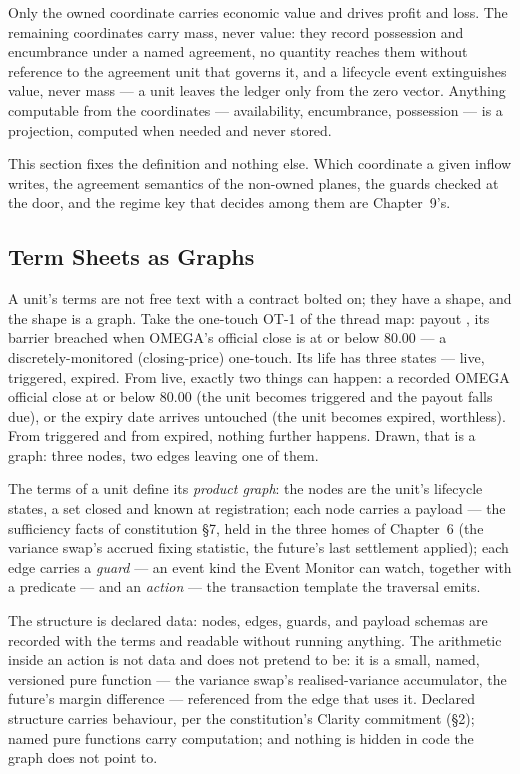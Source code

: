 Only the owned coordinate carries economic value and drives profit and loss. The
remaining coordinates carry mass, never value: they record possession and encumbrance
under a named agreement, no quantity reaches them without reference to the agreement
unit that governs it, and a lifecycle event extinguishes value, never mass --- a unit
leaves the ledger only from the zero vector. Anything computable from the coordinates
--- availability, encumbrance, possession --- is a projection, computed when needed and
never stored.

This section fixes the definition and nothing else. Which coordinate a given inflow
writes, the agreement semantics of the non-owned planes, the guards checked at the door,
and the regime key that decides among them are Chapter~9's.

\subsection{Term Sheets as Graphs}\label{sec:termsheet-graphs}

A unit's terms are not free text with a contract bolted on; they have a shape, and the
shape is a graph. Take the one-touch OT-1 of the thread map: payout ,
its barrier breached when OMEGA's official close is at or below 80.00 --- a
discretely-monitored (closing-price) one-touch. Its life has three states --- live,
triggered, expired. From live, exactly two things can happen: a recorded OMEGA official
close at or below 80.00 (the unit becomes triggered and the payout falls due), or the
expiry date arrives untouched (the unit becomes expired, worthless). From triggered and
from expired, nothing further happens. Drawn, that is a graph: three nodes, two edges
leaving one of them.

\begin{definition}\label{def:product-graph}
The terms of a unit define its \emph{product graph}: the nodes are the unit's lifecycle
states, a set closed and known at registration; each node carries a payload --- the
sufficiency facts of constitution \S 7, held in the three homes of Chapter~6 (the
variance swap's accrued fixing statistic, the future's last settlement applied); each
edge carries a \emph{guard} --- an event kind the Event Monitor can watch, together with
a predicate --- and an \emph{action} --- the transaction template the traversal emits.
\end{definition}

The structure is declared data: nodes, edges, guards, and payload schemas are recorded
with the terms and readable without running anything. The arithmetic inside an action is
not data and does not pretend to be: it is a small, named, versioned pure function ---
the variance swap's realised-variance accumulator, the future's margin difference ---
referenced from the edge that uses it. Declared structure carries behaviour, per the
constitution's Clarity commitment (\S 2); named pure functions carry computation; and
nothing is hidden in code the graph does not point to.

